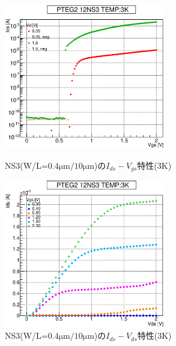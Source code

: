 				\begin{figure}[htbp]
					\begin{minipage}{0.5\hsize}
						\begin{center}
							\includegraphics[width=70mm]{./Chapter/Appendix/Picture/NST/NS3/PTEG2_12_NS3_IdVg_3K.eps}
						\end{center}
						\caption{NS3(W/L=$0.4\mathrm{\mu m}/10\mathrm{\mu m}$)の$I_{ds}-V_{gs}$特性(3K)}
						\label{fig:NS3_IdVg_3K}
					\end{minipage}
					\begin{minipage}{0.5\hsize}
						\begin{center}
							\includegraphics[width=70mm]{./Chapter/Appendix/Picture/NST/NS3/PTEG2_12_NS3_IdVd_3K.eps}
						\end{center}
						\caption{NS3(W/L=$0.4\mathrm{\mu m}/10\mathrm{\mu m}$)の$I_{ds}-V_{ds}$特性(3K)}
						\label{fig:NS3_IdVd_3K}
					\end{minipage}
				\end{figure}
